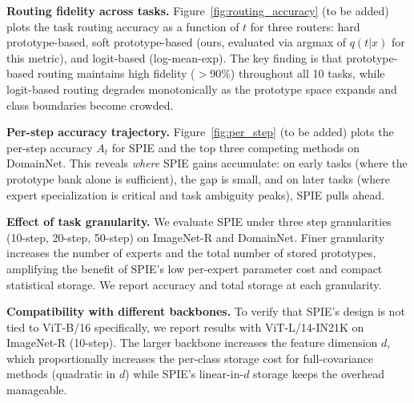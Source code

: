 \noindent\textbf{Routing fidelity across tasks.}
Figure~\ref{fig:routing_accuracy} (to be added) plots the task routing accuracy as a function of $t$ for three routers: hard prototype-based, soft prototype-based (ours, evaluated via argmax of $q(t|x)$ for this metric), and logit-based (log-mean-exp). The key finding is that prototype-based routing maintains high fidelity ($>$90\%) throughout all 10 tasks, while logit-based routing degrades monotonically as the prototype space expands and class boundaries become crowded.

\noindent\textbf{Per-step accuracy trajectory.}
Figure~\ref{fig:per_step} (to be added) plots the per-step accuracy $A_t$ for SPIE and the top three competing methods on DomainNet. This reveals \emph{where} SPIE gains accumulate: on early tasks (where the prototype bank alone is sufficient), the gap is small, and on later tasks (where expert specialization is critical and task ambiguity peaks), SPIE pulls ahead.

\noindent\textbf{Effect of task granularity.}
We evaluate SPIE under three step granularities (10-step, 20-step, 50-step) on ImageNet-R and DomainNet. Finer granularity increases the number of experts and the total number of stored prototypes, amplifying the benefit of SPIE's low per-expert parameter cost and compact statistical storage. We report accuracy and total storage at each granularity.

\noindent\textbf{Compatibility with different backbones.}
To verify that SPIE's design is not tied to ViT-B/16 specifically, we report results with ViT-L/14-IN21K on ImageNet-R (10-step). The larger backbone increases the feature dimension $d$, which proportionally increases the per-class storage cost for full-covariance methods (quadratic in $d$) while SPIE's linear-in-$d$ storage keeps the overhead manageable.
